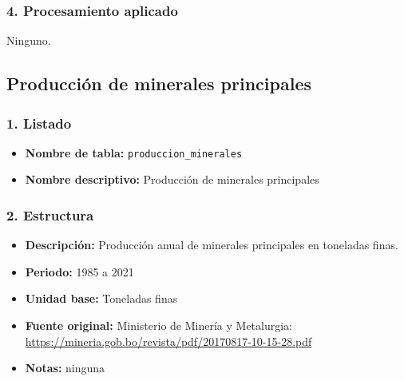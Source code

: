 \documentclass[12pt,a4paper]{article}
\begin{document}
\subsubsection*{4. Procesamiento aplicado}
Ninguno.


\subsection{Producción de minerales principales}

\subsubsection*{1. Listado}
\begin{itemize}
  \item \textbf{Nombre de tabla:} \texttt{produccion\_minerales}
  \item \textbf{Nombre descriptivo:} Producción de minerales principales
\end{itemize}

\subsubsection*{2. Estructura}
\begin{itemize}
  \item \textbf{Descripción:} Producción anual de minerales principales en toneladas finas.
  \item \textbf{Periodo:} 1985 a 2021
  \item \textbf{Unidad base:} Toneladas finas
  \item \textbf{Fuente original:} Ministerio de Minería y Metalurgia:\\
    \url{https://mineria.gob.bo/revista/pdf/20170817-10-15-28.pdf}
  \item \textbf{Notas:} ninguna
\end{itemize}
\end{document}
